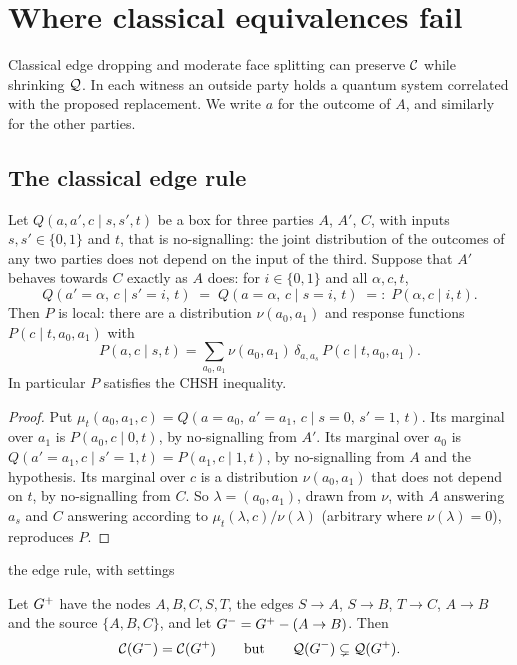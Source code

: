 \section{Where classical equivalences fail}\label{sec:notquantum}
Classical edge dropping and moderate face splitting can preserve $\mathcal{C}$ while shrinking $\mathcal{Q}$.
In each witness an outside party holds a quantum system correlated with the proposed replacement.
We write $a$ for the outcome of $A$, and similarly for the other parties.

\subsection{The classical edge rule}\label{sec:hlp-fails}

\begin{lemma}\label{lem:predict}
Let $Q(a,a',c\mid s,s',t)$ be a box for three parties $A$, $A'$, $C$, with inputs $s,s'\in\{0,1\}$ and $t$, that is
no-signalling: the joint distribution of the outcomes of any two parties does not depend on the input of the
third. Suppose that $A'$ behaves towards $C$ exactly as $A$ does: for $i\in\{0,1\}$ and all $\alpha,c,t$,
\[Q(a'=\alpha,\,c\mid s'=i,\,t)\;=\;Q(a=\alpha,\,c\mid s=i,\,t)\;=:\;P(\alpha,c\mid i,t).\]
Then $P$ is local: there are a distribution $\nu(a_0,a_1)$ and response functions $P(c\mid t,a_0,a_1)$ with
\[
P(a,c\mid s,t)=\sum_{a_0,a_1}\nu(a_0,a_1)\,\delta_{a,a_s}\,P(c\mid t,a_0,a_1).
\]
In particular $P$ satisfies the CHSH inequality.
\end{lemma}
\begin{proof}
Put $\mu_t(a_0,a_1,c)=Q(a=a_0,\,a'=a_1,\,c\mid s=0,\,s'=1,\,t)$. Its marginal over $a_1$ is $P(a_0,c\mid0,t)$, by
no-signalling from $A'$. Its marginal over $a_0$ is $Q(a'=a_1,c\mid s'=1,t)=P(a_1,c\mid1,t)$, by no-signalling
from $A$ and the hypothesis. Its marginal over $c$ is a distribution $\nu(a_0,a_1)$ that does not depend on $t$,
by no-signalling from $C$. So $\lambda=(a_0,a_1)$, drawn from $\nu$, with $A$ answering $a_s$ and $C$ answering
according to $\mu_t(\lambda,c)/\nu(\lambda)$ (arbitrary where $\nu(\lambda)=0$), reproduces $P$.
\end{proof}

\begin{cexbox}{the edge rule, with settings}
\begin{theorem}\label{thm:hlp-settings}
Let $G^{+}$ have the nodes $A,B,C,S,T$, the edges $S\to A$, $S\to B$, $T\to C$, $A\to B$ and the source
$\{A,B,C\}$, and let $G^{-}=G^{+}-(A\to B)$. Then
\[
\mathcal{C}(G^{-})=\mathcal{C}(G^{+})\qquad\text{but}\qquad\mathcal{Q}(G^{-})\subsetneq\mathcal{Q}(G^{+}).
\]
\end{theorem}
\end{cexbox}

